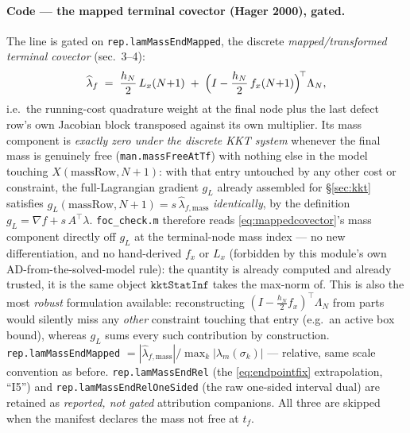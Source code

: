 \documentclass[11pt]{article}
\newcommand{\code}[1]{\texttt{#1}}
\begin{document}
\paragraph{Code --- the mapped terminal covector (Hager 2000), gated.}
The line is gated on \code{rep.lamMassEndMapped}, the discrete
\emph{mapped/transformed terminal covector}
\cite{hager2000transformed} (sec.\ 3--4):
\begin{equation}
\widehat\lambda_f \;=\; \frac{h_N}{2}\,L_x(N{+}1)
\;+\;\Bigl(I-\frac{h_N}{2}\,f_x(N{+}1)\Bigr)^{\!\top}\Lambda_N ,
\label{eq:mappedcovector}
\end{equation}
i.e.\ the running-cost quadrature weight at the final node plus the last
defect row's own Jacobian block transposed against its own multiplier. Its
mass component is \emph{exactly zero under the discrete KKT system} whenever
the final mass is genuinely free (\code{man.massFreeAtTf}) with nothing else
in the model touching $X(\text{massRow},N{+}1)$: with that entry untouched by
any other cost or constraint, the full-Lagrangian gradient $g_L$ already
assembled for \S\ref{sec:kkt} satisfies $g_L(\text{massRow},N{+}1) =
s\,\widehat\lambda_{f,\text{mass}}$ \emph{identically}, by the definition
$g_L=\nabla f + s\,A^{\!\top}\lambda$. \code{foc\_check.m} therefore reads
\eqref{eq:mappedcovector}'s mass component directly off $g_L$ at the
terminal-node mass index --- no new differentiation, and no hand-derived
$f_x$ or $L_x$ (forbidden by this module's own AD-from-the-solved-model rule):
the quantity is already computed and already trusted, it is the same object
$\code{kktStatInf}$ takes the max-norm of. This is also the most
\emph{robust} formulation available: reconstructing
$(I-\tfrac{h_N}{2}f_x)^{\!\top}\Lambda_N$ from parts would silently miss any
\emph{other} constraint touching that entry (e.g.\ an active box bound),
whereas $g_L$ sums every such contribution by construction.
\code{rep.lamMassEndMapped} $= |\widehat\lambda_{f,\text{mass}}| / \max_k
|\lambda_m(\sigma_k)|$ --- relative, same scale convention as before.
\code{rep.lamMassEndRel} (the \eqref{eq:endpointfix} extrapolation, ``I5'')
and \code{rep.lamMassEndRelOneSided} (the raw one-sided interval dual) are
retained as \emph{reported, not gated} attribution companions. All three are
skipped when the manifest declares the mass not free at $t_f$.
\end{document}
